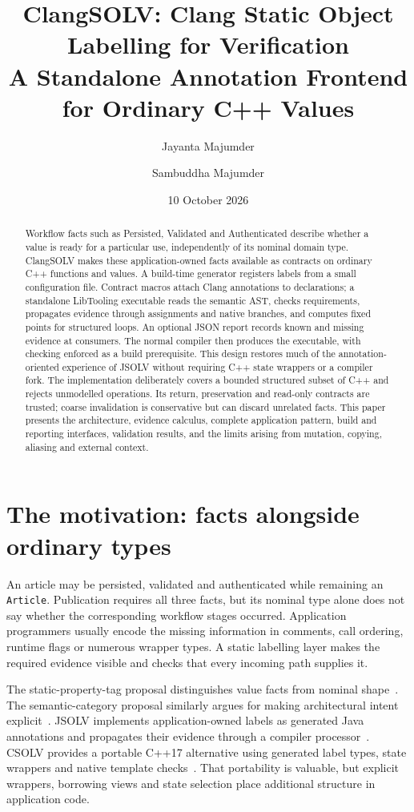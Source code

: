\documentclass[11pt]{article}
\title{ClangSOLV: Clang Static Object Labelling for Verification\\
A Standalone Annotation Frontend for Ordinary C++ Values}
\author{Jayanta Majumder \and Sambuddha Majumder}
\date{10 October 2026}
\newcommand{\csolv}{\textsc{CSOLV}}
\newcommand{\jsolv}{\textsc{JSOLV}}
\begin{document}
\maketitle
\begin{abstract}
Workflow facts such as Persisted, Validated and Authenticated describe whether
a value is ready for a particular use, independently of its nominal domain
type. ClangSOLV makes these application-owned facts available as contracts on
ordinary C++ functions and values. A build-time generator registers labels from
a small configuration file. Contract macros attach Clang annotations to
declarations; a standalone LibTooling executable reads the semantic AST, checks
requirements, propagates evidence through assignments and native branches,
and computes fixed points for structured loops. An optional JSON report
records known and missing evidence at consumers. The normal compiler then
produces the executable, with checking enforced as a build prerequisite.
This design restores much of the annotation-oriented experience of JSOLV
without requiring C++ state wrappers or a compiler fork. The implementation
deliberately covers a bounded structured subset of C++ and rejects unmodelled
operations. Its return, preservation and read-only contracts are trusted;
coarse invalidation is conservative but can discard unrelated facts. This
paper presents the architecture, evidence calculus, complete application
pattern, build and reporting interfaces, validation results, and the limits
arising from mutation, copying, aliasing and external context.
\end{abstract}

\section{The motivation: facts alongside ordinary types}
An article may be persisted, validated and authenticated while remaining an
\texttt{Article}. Publication requires all three facts, but its nominal type
alone does not say whether the corresponding workflow stages occurred.
Application programmers usually encode the missing information in comments,
call ordering, runtime flags or numerous wrapper types. A static labelling
layer makes the required evidence visible and checks that every incoming path
supplies it.

The static-property-tag proposal distinguishes value facts from nominal
shape~\cite{tags}. The semantic-category proposal similarly argues for making
architectural intent explicit~\cite{roles}. \jsolv{} implements application-owned
labels as generated Java annotations and propagates their evidence through
a compiler processor~\cite{jsolv}. \csolv{} provides a portable C++17 alternative
using generated label types, state wrappers and native template checks~\cite{csolv}.
That portability is valuable, but explicit wrappers, borrowing views and state
selection place additional structure in application code.
\end{document}
